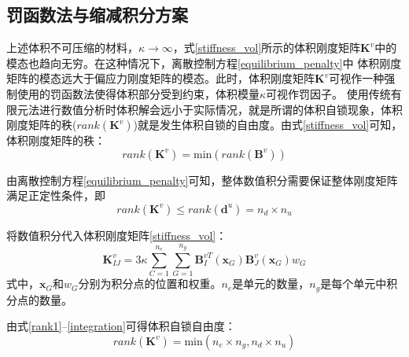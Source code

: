 \subsection{罚函数法与缩减积分方案}
上述体积不可压缩的材料，$\kappa \rightarrow \infty$，式\eqref{stiffness_vol}所示的体积刚度矩阵$\boldsymbol K^v$中的模态也趋向无穷。在这种情况下，离散控制方程\eqref{equilibrium_penalty}中
体积刚度矩阵的模态远大于偏应力刚度矩阵的模态。此时，体积刚度矩阵$\boldsymbol K^v$可视作一种强制使用的罚函数法使得体积部分受到约束，体积模量$\kappa$可视作罚因子。
使用传统有限元法进行数值分析时体积解会远小于实际情况，就是所谓的体积自锁现象，体积刚度矩阵的秩($\mathit{rank}(\boldsymbol K^v)$)就是发生体积自锁的自由度。由式\eqref{stiffness_vol}可知，体积刚度矩阵的秩：
\begin{equation}\label{rank1}
    \mathit{rank}(\boldsymbol K^v)=\text{min}(\mathit{rank}( \boldsymbol B^v))
\end{equation}

由离散控制方程\eqref{equilibrium_penalty}可知，整体数值积分需要保证整体刚度矩阵满足正定性条件，即
\begin{equation}
    \mathit{rank}(\boldsymbol K^v)\le\mathit{rank}( \boldsymbol d^u)=n_d \times n_u
\end{equation}

将数值积分代入体积刚度矩阵\eqref{stiffness_vol}：
\begin{equation}\label{integration}
    \boldsymbol K^v_{IJ} =  3\kappa \sum_{C=1}^{n_e}\sum_{G=1}^{n_g} \boldsymbol B^{vT}_I(\boldsymbol x_G) \boldsymbol B^v_J(\boldsymbol x_G) w_G
\end{equation}
式中，$\boldsymbol x_G$和$w_G$分别为积分点的位置和权重。$n_e$是单元的数量，$n_g$是每个单元中积分点的数量。

由式\eqref{rank1}--\eqref{integration}可得体积自锁自由度：
\begin{equation}\label{rank}
    \mathit{rank}(\boldsymbol K^v)= \text{min}(n_e \times n_g,n_d \times n_u)
\end{equation}

